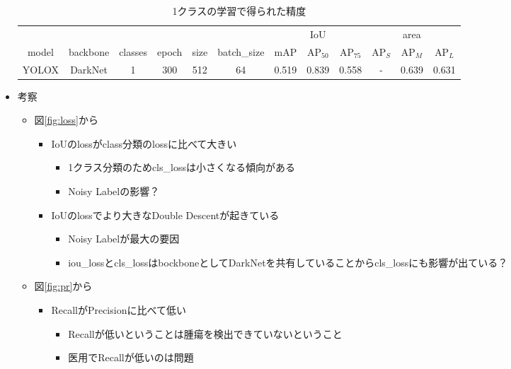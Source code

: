 \documentclass[a4j]{ujarticle}
\newcommand{\Fref}[1]{\mbox{図\ref{fig:#1}}}
\begin{document}
\begin{itemize}
                \begin{table}[h]
                    \centering
                    \caption{1クラスの学習で得られた精度}
                    \label{tab:exp}
                    \begin{tabular}{cccccc|ccc|ccc}
                        & & & & & & & IoU & & & area \footnotemark & \\
                        model & backbone & classes & epoch & size & batch\_size & mAP & AP$_{50}$ & AP$_{75}$ & AP$_S$ & AP$_M$ & AP$_L$ \\ \hline
                        YOLOX\cite{yolox} & DarkNet & 1 & 300 & 512 & 64 & 0.519 & 0.839 & 0.558 & - & 0.639 & 0.631 \\
                    \end{tabular}
                \end{table}

            \item 考察
            \begin{itemize}
                \item \Fref{loss}から
                \begin{itemize}
                    \item IoUのlossがclass分類のlossに比べて大きい
                    \begin{itemize}
                        \item 1クラス分類のためcls\_lossは小さくなる傾向がある
                        \item Noisy Labelの影響？
                    \end{itemize}
                    \item IoUのlossでより大きなDouble Descent\cite{double_descent}が起きている
                    \begin{itemize}
                        \item Noisy Labelが最大の要因
                        \item iou\_lossとcls\_lossはbockboneとしてDarkNetを共有していることからcls\_lossにも影響が出ている？
                    \end{itemize}
                \end{itemize}
                \item \Fref{pr}から
                \begin{itemize}
                    \item RecallがPrecisionに比べて低い
                    \begin{itemize}
                        \item Recallが低いということは腫瘍を検出できていないということ
                        \item 医用でRecallが低いのは問題
                    \end{itemize}
                \end{itemize}
            \end{itemize}
        \end{itemize}
\end{document}
